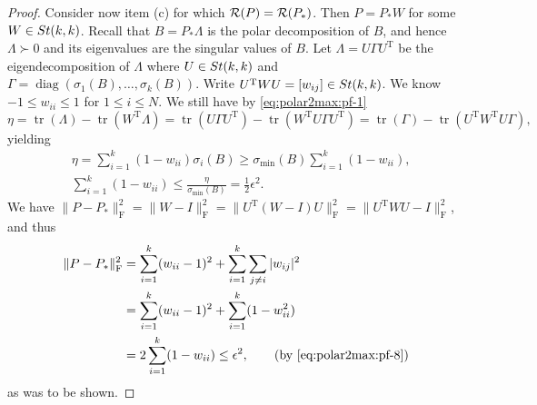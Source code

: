 \documentclass[11pt]{article}
\def\cR{{\cal R}}
\newcommand\STM[2]{{\rm St}(#1,#2)}
\DeclareMathOperator{\diag}{diag}
\DeclareMathOperator{\tr}{tr}
\DeclareMathOperator{\F}{F}
\DeclareMathOperator{\T}{T}
\theoremstyle{definition}
\numberwithin{equation}{section}
\begin{document}
\begin{proof}
Consider now item (c) for which $\cR(P)=\cR(P_*)$. Then $P=P_*W$ for some $W\in\STM{k}{k}$.
Recall that $B=P_*\Lambda$ is the polar decomposition of $B$, and hence  $\Lambda\succ 0$ and its eigenvalues are the singular values of $B$. Let $\Lambda=U\Gamma U^{\T}$ be the eigendecomposition of $\Lambda$ where $U\in\STM{k}{k}$ and
$\Gamma=\diag(\sigma_1(B),\ldots,\sigma_k(B))$.
Write $U^{\T}WU=[w_{ij}]\in\STM{k}{k}$.
We know $-1\le w_{ii}\le 1$ for $1\le i\le N$.
We still have by \eqref{eq:polar2max:pf-1}
$$
\eta=\tr(\Lambda)-\tr(W^{\T}\Lambda)
    =\tr(U\Gamma U^{\T})-\tr(W^{\T}U\Gamma U^{\T})
    =\tr(\Gamma)-\tr(U^{\T}W^{\T}U\Gamma),
$$
yielding
\begin{align}
&\eta=\sum_{i=1}^k(1-w_{ii})\sigma_i(B)
    \ge\sigma_{\min}(B)\sum_{i=1}^k(1-w_{ii}), \nonumber \\
&\sum_{i=1}^k(1-w_{ii})\le\frac {\eta}{\sigma_{\min}(B)}=\frac 12\epsilon^2. \label{eq:polar2max:pf-8}
\end{align}
We have
$\|P-P_*\|_{\F}^2=\|W-I\|_{\F}^2=\|U^{\T}(W-I)U\|_{\F}^2=\|U^{\T}WU-I\|_{\F}^2$, and thus
\begin{align*}
\|P-P_*\|_{\F}^2 %
 &=\sum_{i=1}^k(w_{ii}-1)^2+\sum_{i=1}^k\sum_{j\ne i}|w_{ij}|^2 \\
 &=\sum_{i=1}^k(w_{ii}-1)^2+\sum_{i=1}^k(1-w_{ii}^2) \\
 &=2\sum_{i=1}^k(1-w_{ii})
 \le\epsilon^2, \qquad(\mbox{by \eqref{eq:polar2max:pf-8}})
\end{align*}
as was to be shown.
\end{proof}
\end{document}
